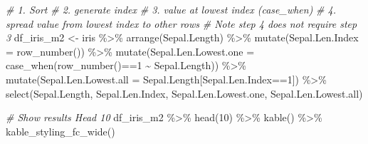 \documentclass[
]{book}
\newenvironment{Shaded}{\begin{snugshade}}{\end{snugshade}}
\newcommand{\AttributeTok}[1]{\textcolor[rgb]{0.77,0.63,0.00}{#1}}
\newcommand{\CommentTok}[1]{\textcolor[rgb]{0.56,0.35,0.01}{\textit{#1}}}
\newcommand{\DecValTok}[1]{\textcolor[rgb]{0.00,0.00,0.81}{#1}}
\newcommand{\FunctionTok}[1]{\textcolor[rgb]{0.00,0.00,0.00}{#1}}
\newcommand{\NormalTok}[1]{#1}
\newcommand{\OtherTok}[1]{\textcolor[rgb]{0.56,0.35,0.01}{#1}}
\newcommand{\SpecialCharTok}[1]{\textcolor[rgb]{0.00,0.00,0.00}{#1}}
\begin{document}
\begin{Shaded}
\begin{Highlighting}[]
\CommentTok{\# 1. Sort}
\CommentTok{\# 2. generate index}
\CommentTok{\# 3. value at lowest index (case\_when)}
\CommentTok{\# 4. spread value from lowest index to other rows}
\CommentTok{\# Note step 4 does not require step 3}
\NormalTok{df\_iris\_m2 }\OtherTok{\textless{}{-}}\NormalTok{ iris }\SpecialCharTok{\%\textgreater{}\%} \FunctionTok{arrange}\NormalTok{(Sepal.Length) }\SpecialCharTok{\%\textgreater{}\%}
              \FunctionTok{mutate}\NormalTok{(}\AttributeTok{Sepal.Len.Index =} \FunctionTok{row\_number}\NormalTok{()) }\SpecialCharTok{\%\textgreater{}\%}
              \FunctionTok{mutate}\NormalTok{(}\AttributeTok{Sepal.Len.Lowest.one =}
                       \FunctionTok{case\_when}\NormalTok{(}\FunctionTok{row\_number}\NormalTok{()}\SpecialCharTok{==}\DecValTok{1} \SpecialCharTok{\textasciitilde{}}\NormalTok{ Sepal.Length)) }\SpecialCharTok{\%\textgreater{}\%}
              \FunctionTok{mutate}\NormalTok{(}\AttributeTok{Sepal.Len.Lowest.all =}
\NormalTok{                       Sepal.Length[Sepal.Len.Index}\SpecialCharTok{==}\DecValTok{1}\NormalTok{]) }\SpecialCharTok{\%\textgreater{}\%}
              \FunctionTok{select}\NormalTok{(Sepal.Length, Sepal.Len.Index,}
\NormalTok{                     Sepal.Len.Lowest.one, Sepal.Len.Lowest.all)}


\CommentTok{\# Show results Head 10}
\NormalTok{df\_iris\_m2 }\SpecialCharTok{\%\textgreater{}\%} \FunctionTok{head}\NormalTok{(}\DecValTok{10}\NormalTok{) }\SpecialCharTok{\%\textgreater{}\%}
  \FunctionTok{kable}\NormalTok{() }\SpecialCharTok{\%\textgreater{}\%}
  \FunctionTok{kable\_styling\_fc\_wide}\NormalTok{()}
\end{Highlighting}
\end{Shaded}
\end{document}
